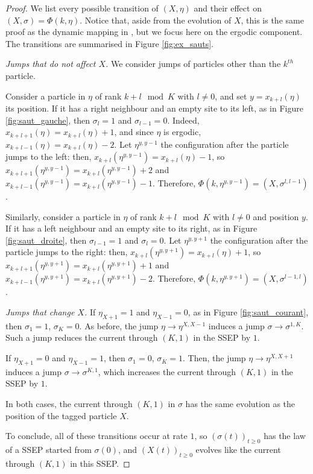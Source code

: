 \documentclass[11pt,a4paper]{article}
\begin{document}
\begin{proof}We list every possible transition of $(X,\eta)$ and their effect on $(X,\sigma) = \Phi(k,\eta)$. Notice that, aside from the evolution of $X$, this is the same proof as the dynamic mapping in \cite{erignoux_cutoff_2024}, but we focus here on the ergodic component. The transitions are summarised in Figure \ref{fig:ex_sauts}.

\medskip
\noindent \textit{Jumps that do not affect $X$.} We consider jumps of particles other than the $k^{th}$ particle.

\smallskip
Consider a particle in $\eta$ of rank $k+l \mod K$ with $l\neq 0$, and set $y=x_{k+l}(\eta)$ its position. If it has a right neighbour and an empty site to its left, as in Figure \ref{fig:saut_gauche}, then $\sigma_l = 1$ and $\sigma_{l-1}=0$. %
Indeed, $x_{k+l+1}(\eta)=x_{k+l}(\eta)+1$, and since $\eta$ is ergodic, $x_{k+l-1}(\eta)=x_{k+l}(\eta)-2$. %
Let $\eta^{y,y-1}$ the configuration after the particle jumps to the left: then, $x_{k+l}(\eta^{y,y-1})=x_{k+l}(\eta)-1$, so $x_{k+l+1}(\eta^{y,y-1})=x_{k+l}(\eta^{y,y-1})+2$ and $x_{k+l-1}(\eta^{y,y-1})=x_{k+l}(\eta^{y,y-1})-1$. %
Therefore, $\Phi(k,\eta^{y,y-1}) = (X,\sigma^{l,l-1})$. 
\smallskip

Similarly, consider a particle in $\eta$ of rank $k+l \mod K$ with $l\neq 0$  and position $y$. If it has a left neighbour and an empty site to its right, as in Figure \ref{fig:saut_droite}, then $\sigma_{l-1} = 1$ and $\sigma_{l}=0$. %
Let $\eta^{y,y+1}$ the configuration after the particle jumps to the right: then, $x_{k+l}(\eta^{y,y+1})=x_{k+l}(\eta)+1$, so $x_{k+l+1}(\eta^{y,y+1})=x_{k+l}(\eta^{y,y+1})+1$ and $x_{k+l-1}(\eta^{y,y+1})=x_{k+l}(\eta^{y,y+1})-2$. %
Therefore, $\Phi(k,\eta^{y,y+1}) = (X,\sigma^{l-1,l})$. 

\medskip
\noindent \textit{Jumps that change $X$.} If $\eta_{X+1} = 1$ and $\eta_{X-1} = 0$, as in Figure \ref{fig:saut_courant}, then $\sigma_1 = 1$, $\sigma_K = 0$. As before, the jump $\eta \to \eta^{X,X-1}$ induces a jump $\sigma \to \sigma^{1,K}$. Such a jump reduces the current through $(K,1)$ in the SSEP by $1$. 

If $\eta_{X+1} = 0$ and $\eta_{X-1} = 1$, then $\sigma_1 = 0$, $\sigma_K = 1$. Then, the jump $\eta \to \eta^{X,X+1}$ induces a jump $\sigma \to \sigma^{K,1}$, which increases the current through $(K,1)$ in the SSEP by $1$. 

In both cases, the current through $(K,1)$ in $\sigma$ has the same evolution as the position of the tagged particle $X$. 

\medskip
To conclude, all of these transitions occur at rate $1$, so $(\sigma(t))_{t\ge 0}$ has the law of a SSEP started from $\sigma(0)$, and $(X(t))_{t\ge 0}$ evolves like the current through $(K,1)$ in this SSEP.
\end{proof}
\end{document}
